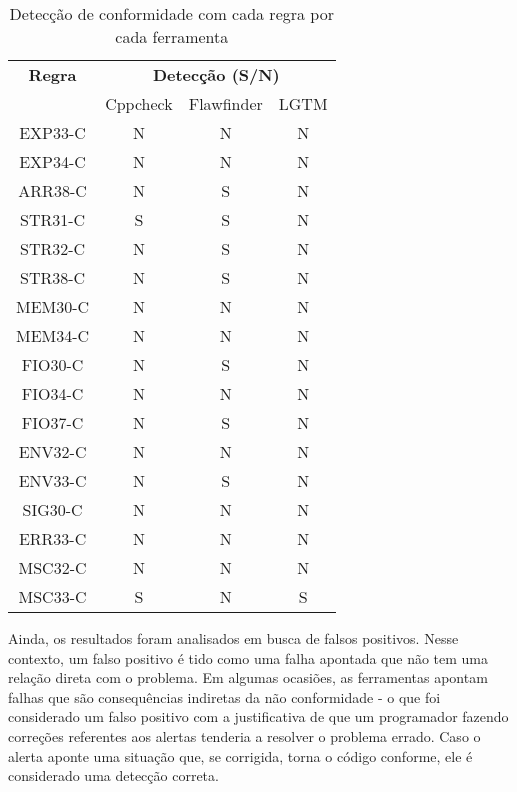 \begin{table}[]
\begin{tabular}{@{}cccc@{}}
\toprule
\textbf{Regra} & \multicolumn{3}{c}{\textbf{Detecção (S/N)}} \\
               & Cppcheck & Flawfinder & LGTM \\ \midrule
EXP33-C        & N        & N          & N    \\ \midrule
EXP34-C        & N        & N          & N    \\ \midrule
ARR38-C        & N        & S          & N    \\ \midrule
STR31-C        & S        & S          & N    \\ \midrule
STR32-C        & N        & S          & N    \\ \midrule
STR38-C        & N        & S          & N    \\ \midrule
MEM30-C        & N        & N          & N    \\ \midrule
MEM34-C        & N        & N          & N    \\ \midrule
FIO30-C        & N        & S          & N    \\ \midrule
FIO34-C        & N        & N          & N    \\ \midrule
FIO37-C        & N        & S          & N    \\ \midrule
ENV32-C        & N        & N          & N    \\ \midrule
ENV33-C        & N        & S          & N    \\ \midrule
SIG30-C        & N        & N          & N    \\ \midrule
ERR33-C        & N        & N          & N    \\ \midrule
MSC32-C        & N        & N          & N    \\ \midrule
MSC33-C        & S        & N          & S    \\ \bottomrule
\end{tabular}
\caption{Detecção de conformidade com cada regra por cada ferramenta}
\label{tab:all}
\end{table}

Ainda, os resultados foram analisados em busca de falsos positivos. Nesse contexto, um falso positivo é tido como uma falha apontada que não tem uma relação direta com o problema. Em algumas ocasiões, as ferramentas apontam falhas que são consequências indiretas da não conformidade - o que foi considerado um falso positivo com a justificativa de que um programador fazendo correções referentes aos alertas tenderia a resolver o problema errado. Caso o alerta aponte uma situação que, se corrigida, torna o código conforme, ele é considerado uma detecção correta.

